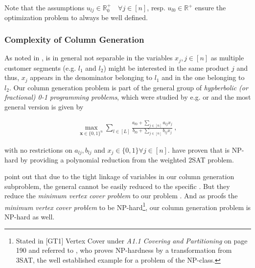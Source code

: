 Note that the assumptions $u_{lj} \in \mathbb{R}^+_0 \quad \forall j \in [n]$, resp. $u_{l0} \in \mathbb{R}^+$ ensure the optimization problem to always be well defined.

\subsubsection{Complexity of Column Generation}

As noted in \cite{Bront.2009},  is in general not separable in the variables $x_j, j\in[n]$ as multiple customer segments (e.g. $l_1$ and $l_2$) might be interested in the same product $j$ and thus, $x_j$ appears in the denominator belonging to $l_1$ and in the one belonging to $l_2$. Our column generation problem is part of the general group of \emph{hypberbolic (or fractional) 0-1 programming problems}, which were studied by e.g. \cite{Hansen.1991} or \cite{Borrero.2017} and the most general version is given by


\begin{align}
	\max_{\boldsymbol{x} \in \{0,1\}^n} \sum_{l \in [L]} \frac{a_{l0} + \sum_{j \in [n]}a_{lj}x_j}{b_{l0} + \sum_{j \in [n]} b_{lj}x_j}~,\label{eq-hyp}
\end{align}

with no restrictions on $a_{lj}, b_{lj}$ and $x_j \in \{0, 1\} \forall j \in [n]$. \cite{Prokopyev.2005} have proven that  is NP-hard by providing a polynomial reduction from the weighted 2SAT problem. 


\cite{Bront.2009} point out that due to the tight linkage of variables in our column generation subproblem, the general  cannot be easily reduced to the specific . But they reduce the \emph{minimum vertex cover problem} to our problem . And as \cite{Garey.ca.2009} proofs the \emph{minimum vertex cover problem} to be NP-hard\footnote{Stated in [GT1] Vertex Cover under \emph{A1.1 Covering and Partitioning} on page 190 and referred to \cite{Karp.2010}, who proves NP-hardness by a transformation from 3SAT, the well established example for a problem of the NP-class.}, our column generation problem is NP-hard as well. 

